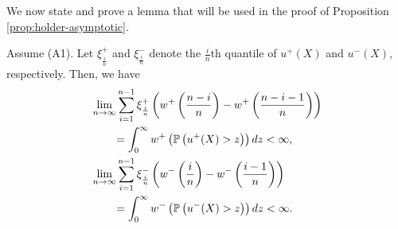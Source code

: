 We now state and prove a lemma that will be used in the proof of Proposition \ref{prop:holder-asymptotic}.
\begin{proposition}
\label{prop:holder-quantile}
Assume (A1). Let $\xi^+_{\frac{i}{n}}$ and $\xi^-_{\frac{i}{n}}$ denote the $\frac{i}{n}$th quantile of $u^+(X)$ and $u^-(X)$, respectively. Then, we have  
\begin{align}
&\lim_{n \rightarrow \infty} \sum_{i=1}^{n-1} \xi^+_{\frac{i}{n}} \left(w^+\left(\frac{n-i}{n}\right)- w^+\left(\frac{n-i-1}{n}\right) \right)  \nonumber\\
&\qquad= \int_0^{\infty} w^+\left(\mathbb{P}\left( u^+(X)>z \right)\right) dz < \infty,\label{eq:simple-estimation}\\
&\lim_{n \rightarrow \infty} \sum_{i=1}^{n-1} \xi^-_{\frac{i}{n}} \left(w^-\left(\frac{i}{n}\right)- w^-\left(\frac{i-1}{n}\right) \right) \nonumber\\
&\qquad= \int_0^{\infty} w^-\left(\mathbb{P}\left( u^-(X)>z \right)\right) dz < \infty.\label{eq:simple-estimation2}
\end{align}
\end{proposition}


